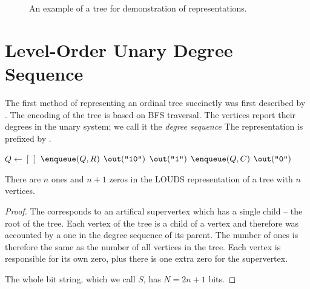 \begin{figure}[h]
	\centering
	\caption{An example of a tree for demonstration of representations.}
	\label{fig:tree}
\end{figure}

\section{Level-Order Unary Degree Sequence}

The first method of representing an ordinal tree succinctly was first described by \cite{jacobson1989space}.
The encoding of the tree is based on BFS traversal.
The vertices report their degrees in the unary system; we call it the \emph{degree sequence}
The representation is prefixed by .

\begin{algorithm}
\begin{algorithmic}
	\State $Q \gets [\,]$%
	\Instr $\enqueue(Q, R)$ 
	\State $\out(\str{10})$
			\State $\out(\str1)$
			\State $\enqueue(Q, C)$
		\EndFor
		\State $\out(\str0)$
	\EndWhile
\EndFunction
\end{algorithmic}
\end{algorithm}

\begin{lemma}
	There are $n$ ones and $n+1$ zeros in the LOUDS representation of a tree with $n$ vertices.
\end{lemma}
\begin{proof}
	The  corresponds to an artifical supervertex which has a single child -- the root of the tree.
	Each vertex of the tree is a child of a vertex and therefore was accounted by a one in the degree sequence of its parent.
	The number of ones is therefore the same as the number of all vertices in the tree.
	Each vertex is responsible for its own zero, plus there is one extra zero for the supervertex.
	
	The whole bit string, which we call $S$, has $N = 2n + 1$ bits.
\end{proof}

